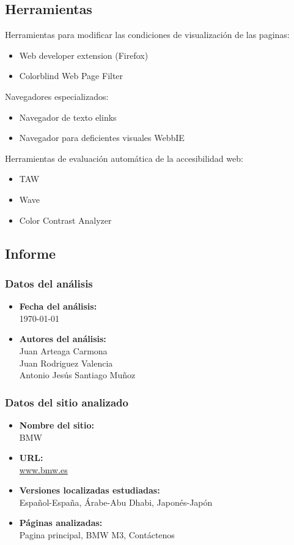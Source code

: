 \documentclass[a4paper,11pt]{article}
\begin{document}
\subsection{Herramientas}
Herramientas para modificar las condiciones de visualización de las paginas:
\begin{itemize}
  \item Web developer extension (Firefox) \cite{webdevel}
  \item Colorblind Web Page Filter \cite{colorblind}
\end{itemize}

Navegadores especializados:
\begin{itemize}
  \item Navegador de texto elinks \cite{elinks}
  \item Navegador para deficientes visuales WebbIE \cite{webbie}
\end{itemize}

Herramientas de evaluación automática de la accesibilidad web:
\begin{itemize}
  \item TAW \cite{taw}
  \item Wave \cite{wave}
  \item Color Contrast Analyzer \cite{colorcontrast}
\end{itemize}

\subsection{Informe}
\subsubsection{Datos del análisis}
\begin{itemize}
  \item \textbf{Fecha del análisis:}\\
  \today
  \item \textbf{Autores del análisis:}\\
      Juan Arteaga Carmona\\
      Juan Rodriguez Valencia\\
      Antonio Jesús Santiago Muñoz
\end{itemize}

\subsubsection{Datos del sitio analizado}
\begin{itemize}
\item \textbf{Nombre del sitio:}\\
BMW
\item \textbf{URL:}\\
\url{www.bmw.es}\\
\item \textbf{Versiones localizadas estudiadas:}\\
Español-España, Árabe-Abu Dhabi, Japonés-Japón
\item \textbf{Páginas analizadas:}\\
Pagina principal, BMW M3, Contáctenos
\end{itemize}
\end{document}
